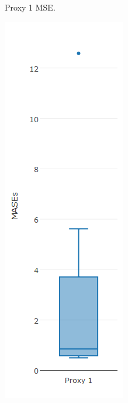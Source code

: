 \begin{figure}[!h]
{\begin{subfigure}{.25\linewidth}
  \caption{Proxy 1 MSE.}
  \label{fig:bp2.1c}
\end{subfigure}%
\begin{subfigure}{.25\linewidth}
  \centering
  \includegraphics[width=\linewidth]{img/10ysigmaMasebpNaive.png}

\end{subfigure}}
\end{figure}
